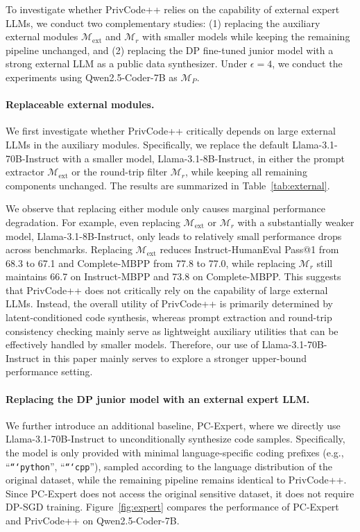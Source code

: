 \documentclass{article}
\theoremstyle{plain}
\theoremstyle{definition}
\theoremstyle{remark}
\def \toolname{PrivCode++}
\begin{document}
{To investigate whether \toolname{} relies on the capability of external expert LLMs, we conduct two complementary studies: (1) replacing the auxiliary external modules $\mathcal{M}_{\text{ext}}$ and $\mathcal{M}_r$ with smaller models while keeping the remaining pipeline unchanged, and (2) replacing the DP fine-tuned junior model with a strong external LLM as a public data synthesizer. Under $\epsilon = 4$, we conduct the experiments using Qwen2.5-Coder-7B as $\mathcal{M}_P$.



\paragraph{Replaceable external modules.}
We first investigate whether \toolname{} critically depends on large external LLMs in the auxiliary modules. Specifically, we replace the default Llama-3.1-70B-Instruct with a smaller model, Llama-3.1-8B-Instruct, in either the prompt extractor $\mathcal{M}_{\text{ext}}$ or the round-trip filter $\mathcal{M}_r$, while keeping all remaining components unchanged. The results are summarized in Table~\ref{tab:external}.

We observe that replacing either module only causes marginal performance degradation. For example, even replacing $\mathcal{M}_{\text{ext}}$ or $\mathcal{M}_r$ with a substantially weaker model, Llama-3.1-8B-Instruct, only leads to relatively small performance drops across benchmarks. Replacing $\mathcal{M}_{\text{ext}}$ reduces Instruct-HumanEval Pass@1 from 68.3 to 67.1 and Complete-MBPP from 77.8 to 77.0, while replacing $\mathcal{M}_r$ still maintains 66.7 on Instruct-MBPP and 73.8 on Complete-MBPP. This suggests that \toolname{} does not critically rely on the capability of large external LLMs. Instead, the overall utility of \toolname{} is primarily determined by latent-conditioned code synthesis, whereas prompt extraction and round-trip consistency checking mainly serve as lightweight auxiliary utilities that can be effectively handled by smaller models. Therefore, our use of Llama-3.1-70B-Instruct in this paper mainly serves to explore a stronger upper-bound performance setting.



\paragraph{Replacing the DP junior model with an external expert LLM.}
We further introduce an additional baseline, PC-Expert, where we directly use Llama-3.1-70B-Instruct to unconditionally synthesize code samples. Specifically, the model is only provided with minimal language-specific coding prefixes (e.g., ``\texttt{```python}'', ``\texttt{```cpp}''), sampled according to the language distribution of the original dataset, while the remaining pipeline remains identical to \toolname{}. Since PC-Expert does not access the original sensitive dataset, it does not require DP-SGD training. Figure~\ref{fig:expert} compares the performance of PC-Expert and \toolname{} on Qwen2.5-Coder-7B.

}
\end{document}
